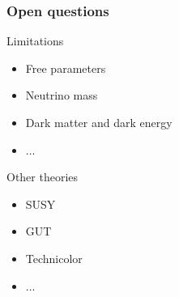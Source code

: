\documentclass{beamer}
\begin{document}
    \begin{frame}
      \frametitle{Open questions}

      \begin{alertblock}{Limitations}
        \begin{itemize}
          \item Free parameters
          \item Neutrino mass
          \item Dark matter and dark energy
          \item ...
        \end{itemize}
      \end{alertblock}
      
      \begin{block}{Other theories}
        \begin{itemize}
          \item SUSY
          \item GUT
          \item Technicolor
          \item ...
        \end{itemize}
      \end{block}
    \end{frame}
     



%
%
%
%
%     
\end{document}
